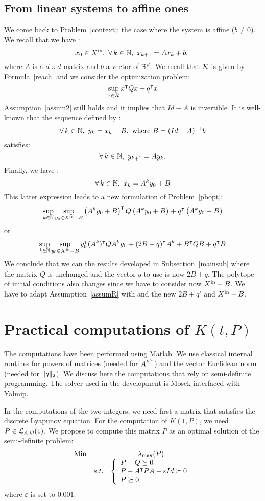 \documentclass[10pt]{article}
\begin{document}
\subsection{From linear systems to affine ones}
\label{affine}
We come back to Problem~\eqref{context}: the case where the system is affine ($b\neq 0$). We recall that we have :
\[
x_0\in \xin,\ \forall\, k\in\nn,\ x_{k+1}=A x_k+b,\
\]
where $A$ is a $d\times d$ matrix and $b$ a vector of $\mathbb R^d$. We recall that $\mathcal{R}$ is given by Formula~\eqref{reach} and we consider the optimization problem:
\[
\sup_{x\in\mathcal{R}} x^\intercal Q x+q^\intercal x
\]
Assumption~\ref{assum2} still holds and it implies that $Id-A$ is invertible. It is well-known that the sequence defined by :
\[
\forall\, k\in\mathbb{N},\ y_k=x_k-B,\text{ where } B=(Id-A)^{-1} b
\]
satisfies:
\[
\forall\, k\in\mathbb{N},\ y_{k+1}=A y_k. 
\]
Finally, we have :
\[
\forall\, k\in\nn,\ x_k=A^k y_0+B
\]
This latter expression leads to a new formulation of Problem~\eqref{pbopt}: 
\[
\sup_{k\in\mathbb{N}} \sup_{y_0\in X^\mathrm{in}-B} \left(A^k y_0+B\right)^\intercal Q  \left(A^k y_0+B\right)+q^\intercal  \left(A^k y_0+B\right)
\]
or
\[
\sup_{k\in\mathbb{N}} \sup_{y_0\in X^\mathrm{in}-B} y_0^\intercal (A^k)^\intercal Q  A^k y_0+(2B+q)^\intercal A^k +B^\intercal Q B+q^\intercal B
\]
We conclude that we can the results developed in Subsection~\ref{mainsub} where the matrix $Q$ is unchanged and the vector $q$ to use is now $2B+q$. The polytope of initial conditions also changes since we have to consider now $X^\mathrm{in}-B$. We have to adapt Assumption~\ref{assumR} with  and the new  $2B+q'$ and $X^\mathrm{in}-B$.

\section{Practical computations of $K(t,P)$}
\label{computations}
The computations have been performed using Matlab. We use classical internal routines for powers of matrices  (needed for $A^{k^{>}}$) and  the vector Euclidean norm (needed for $\| q\|_2$). We discuss here the computations that rely on semi-definite programming. The solver used in the development is Mosek interfaced with Yalmip. 

In the computations of the two integers, we need first a matrix that satisfies the discrete Lyapunov equation. For the computation of $K(1,P)$, we need $P \in \mathcal{L}_{A,Q}(1)$. We propose to compute this matrix $P$ as an optimal solution  of the semi-definite problem:
\begin{equation}
\label{eq:kunp}
\begin{array}{llc}
\operatorname*{Min} & &\lambda_{\operatorname{max}}(P)\\
 & s. t. &\left\{\begin{array}{l} 
         P-Q\succeq 0\\
         P-A^\intercal P A-\varepsilon Id\succeq 0\\
         P\succeq  0
        \end{array}\right.
\end{array}
\end{equation}
where $\varepsilon$ is set to $0.001$.
\end{document}
